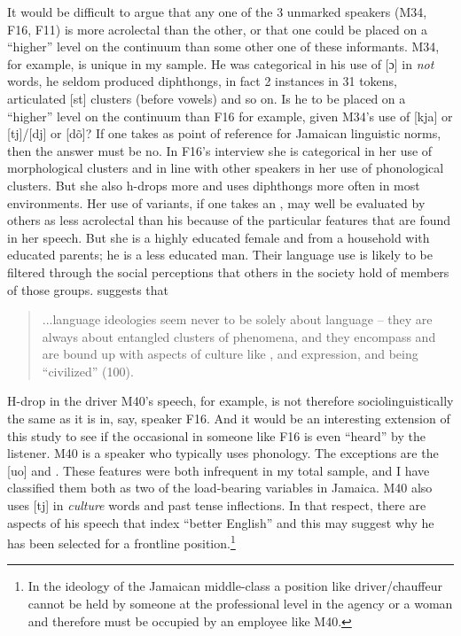 It would be difficult to argue that any one of the 3 unmarked speakers (M34, F16, F11) is more acrolectal than the other, or that one could be placed on a “higher” level on the continuum than some other one of these informants.  M34, for example, is unique in my sample.  He was categorical in his use of [ɔ] in \textit{not} words, he seldom produced diphthongs, in fact 2 instances in 31 tokens, articulated [st] clusters (before vowels) and so on.  Is he to be placed on a “higher” level on the continuum than F16 for example, given M34's use of [kja] or [tj]\slash [dj] or [dõ]?  If one takes  as point of reference for Jamaican linguistic norms, then the answer must be no.  In F16's interview she is categorical in her use of morphological clusters and in line with other  speakers in her use of phonological clusters.  But she also h-drops more and uses diphthongs more often in most environments.  Her use of variants, if one takes an , may well be evaluated by others as less acrolectal than his because of the particular features that are found in her speech.  But she is a highly educated female and from a household with educated parents; he is a less educated man.  Their language use is likely to be filtered through the social perceptions that others in the society hold of members of those groups.  \citet{Kulick1998} suggests that

\begin{quote}
	...language ideologies seem never to be solely about language – they are always about entangled clusters of phenomena, and they encompass and are bound up with aspects of culture like , and expression, and being “civilized” (100).
\end{quote}

H-drop in the driver M40's speech, for example, is not therefore sociolinguistically the same as it is in, say, speaker F16.  And it would be an interesting extension of this study to see if the occasional  in someone like F16 is even “heard” by the listener.  M40 is a speaker who typically uses  phonology.  The exceptions are the  [uo] and .  These features were both infrequent in my total sample, and I have classified them both as two of the load-bearing variables in Jamaica.  M40 also uses [tj] in \textit{culture} words and past tense inflections.  In that respect, there are aspects of his speech that index “better English” and this may suggest why he has been selected for a frontline position.{\footnote{In the ideology of the Jamaican middle-class \citep[236]{Austin1983} a position like driver\slash chauffeur cannot be held by someone at the professional level in the agency or a woman and therefore must be occupied by an employee like M40.}}

